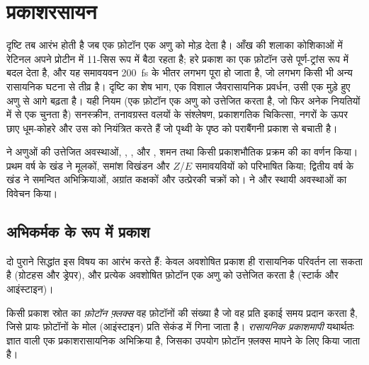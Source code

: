 \chapter{प्रकाशरसायन}\label{ch:b3:photochemistry}

दृष्टि तब आरंभ होती है जब एक फ़ोटॉन एक अणु को मोड़ देता है। आँख की शलाका कोशिकाओं में
रेटिनल अपने प्रोटीन में 11-सिस रूप में बैठा रहता है; हरे प्रकाश का एक फ़ोटॉन उसे
पूर्ण-ट्रांस रूप में बदल देता है, और यह समावयवन \qty{200}{fs} के भीतर लगभग पूरा हो जाता है,
जो लगभग किसी भी अन्य रासायनिक घटना से तीव्र है। दृष्टि का शेष भाग, एक विशाल जैवरासायनिक
प्रवर्धन, उसी एक मुड़े हुए अणु से आगे बढ़ता है। यही नियम (एक फ़ोटॉन एक अणु को उत्तेजित करता है,
जो फिर अनेक नियतियों में से एक चुनता है) सनस्क्रीन, तनावग्रस्त वलयों के संश्लेषण,
प्रकाशगतिक चिकित्सा, नगरों के ऊपर छाए धूम-कोहरे और उस  को नियंत्रित करते हैं जो
पृथ्वी के पृष्ठ को पराबैंगनी प्रकाश से बचाती है।

\begin{recall}
 ने अणुओं की उत्तेजित अवस्थाओं, , ,
 और , शमन तथा किसी प्रकाशभौतिक प्रक्रम की  का वर्णन किया।
प्रथम वर्ष के खंड ने मूलकों, समांश विखंडन और $Z$/$E$ समावयवियों को परिभाषित किया; द्वितीय वर्ष
के खंड ने समन्वित अभिक्रियाओं, अग्रांत कक्षकों और उत्प्रेरकी चक्रों को।
 ने  और स्थायी अवस्थाओं का विवेचन किया।
\end{recall}

\section{अभिकर्मक के रूप में प्रकाश}

दो पुराने सिद्धांत इस विषय का आरंभ करते हैं: केवल अवशोषित प्रकाश ही रासायनिक परिवर्तन
ला सकता है (ग्रोटहस और ड्रेपर), और प्रत्येक अवशोषित फ़ोटॉन एक अणु को उत्तेजित करता है
(स्टार्क और आइंस्टाइन)।

\begin{definition}[फ़ोटॉन फ़्लक्स, रासायनिक प्रकाशमापी]\label{def:b3:photochemistry:photon-flux}
किसी प्रकाश स्रोत का \emph{फ़ोटॉन फ़्लक्स} वह फ़ोटॉनों की संख्या है जो वह
प्रति इकाई समय प्रदान करता है, जिसे प्रायः फ़ोटॉनों के मोल (आइंस्टाइन) प्रति सेकंड में गिना जाता है।
\emph{रासायनिक प्रकाशमापी} यथार्थतः ज्ञात  वाली एक
प्रकाशरासायनिक अभिक्रिया है, जिसका उपयोग फ़ोटॉन फ़्लक्स मापने के लिए
किया जाता है।
\end{definition}

